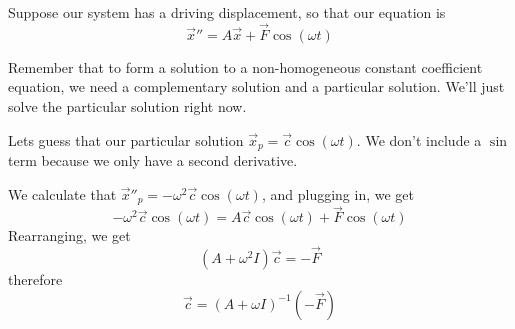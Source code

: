 \documentclass{article}
\begin{document}
Suppose our system has a driving displacement, so that our equation is $$\vec{x}'' = A\vec{x} + \vec{F}\cos(\omega t)$$

Remember that to form a solution to a non-homogeneous constant coefficient equation, we need a complementary solution and a particular solution. We'll just solve the particular solution right now.

Lets guess that our particular solution $\vec{x}_p = \vec{c}\cos(\omega t)$. We don't include a $\sin$ term because we only have a second derivative.

We calculate that $\vec{x}''_p = -\omega^2\vec{c}\cos(\omega t)$, and plugging in, we get $$-\omega^2\vec{c}\cos(\omega t) =A\vec{c}\cos(\omega t) + \vec{F}\cos(\omega t)$$Rearranging, we get $$(A + \omega^2I)\vec{c} = - \vec{F}$$therefore$$\vec{c} = (A+\omega I) ^{-1} (-\vec{F})$$
\end{document}
